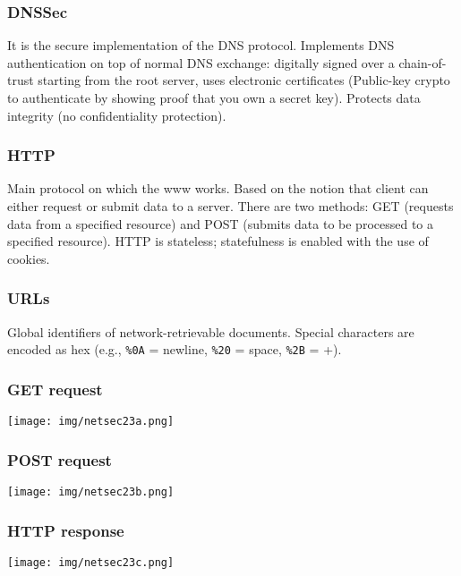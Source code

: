 \documentclass[a4paper, 10pt, titlepage]{article}
\begin{document}
\subsubsection{DNSSec}
It is the secure implementation of the DNS protocol. Implements DNS authentication on top of normal DNS exchange: digitally signed over a chain-of-trust starting from the root server, uses electronic certificates (Public-key crypto to authenticate by showing proof that you own a secret key). Protects data integrity (no confidentiality protection).

\subsubsection{HTTP}
\label{http}
Main protocol on which the www works. Based on the notion that client can either request or submit data to a server. There are two methods: GET (requests data from a specified resource) and POST (submits data to be processed to a specified resource). HTTP is stateless; statefulness is enabled with the use of cookies.

\subsubsection*{URLs}
Global identifiers of network-retrievable documents. Special characters are encoded as hex (e.g., \lstinline|%0A| = newline, \lstinline|%20| = space, \lstinline|%2B| = +).

\subsubsection*{GET request}
\begin{center}
	\texttt{[image: img/netsec23a.png]}
\end{center}

\subsubsection*{POST request}
\begin{center}
	\texttt{[image: img/netsec23b.png]}
\end{center}

\subsubsection*{HTTP response}
\begin{center}
	\texttt{[image: img/netsec23c.png]}
\end{center}
\end{document}
